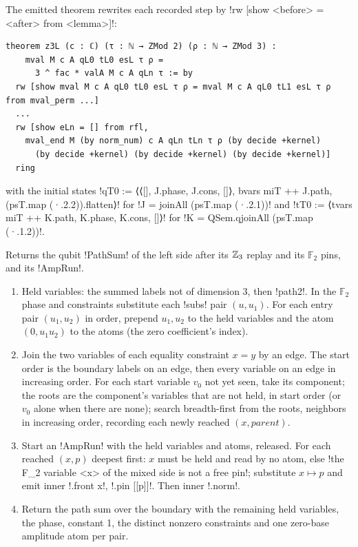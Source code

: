 {{{\begin{algorithm}
\end{algorithm}
The emitted theorem rewrites each recorded step by \lexlean!rw [show <before> = <after> from <lemma>]!:
\begin{lstlisting}[style=lexlean]
theorem z3L (c : ℂ) (τ : ℕ → ZMod 2) (ρ : ℕ → ZMod 3) :
    mval M c A qL0 tL0 esL τ ρ =
      3 ^ fac * valA M c A qLn τ := by
  rw [show mval M c A qL0 tL0 esL τ ρ = mval M c A qL0 tL1 esL τ ρ from mval_perm ...]
  ...
  rw [show eLn = [] from rfl,
    mval_end M (by norm_num) c A qLn tLn τ ρ (by decide +kernel)
      (by decide +kernel) (by decide +kernel) (by decide +kernel)]
  ring
\end{lstlisting}
with the initial states
\lexlean!qT0 := ⟨⟨[], J.phase, J.cons, []⟩, bvars miT ++ J.path, (psT.map (·.2.2)).flatten⟩! for
\lexlean!J = joinAll (psT.map (·.2.1))! and
\lexlean!tT0 := ⟨tvars miT ++ K.path, K.phase, K.cons, []⟩! for
\lexlean!K = QSem.qjoinAll (psT.map (·.1.2))!.

\begin{algorithm}\label{alg:lean-export-mix-qubit}
Returns the qubit \lexpy!PathSum! of the left side after its $\mathbb{Z}_3$ replay and its
$\mathbb{F}_2$ pins, and its \lexpy!AmpRun!.
\begin{enumerate}
\item Held variables: the summed labels not of dimension 3, then \lexcode!path2!. In the
$\mathbb{F}_2$ phase and constraints substitute each \lexcode!subs! pair $(u, u_1)$. For each
entry pair $(u_1, u_2)$ in order, prepend $u_1, u_2$ to the held variables and the atom
$(0, u_1u_2)$ to the atoms (the zero coefficient's index).
\item Join the two variables of each equality constraint $x = y$ by an edge. The start order is
the boundary labels on an edge, then every variable on an edge in increasing order. For each
start variable $v_0$ not yet seen, take its component; the roots are the component's variables
that are not held, in start order (or $v_0$ alone when there are none); search breadth-first
from the roots, neighbors in increasing order, recording each newly reached
$(x, \mathit{parent})$.
\item Start an \lexpy!AmpRun! with the held variables and atoms, released. For each reached
$(x, p)$ deepest first: $x$ must be held and read by no atom, else
\lexcode!the F_2 variable <x> of the mixed side is not a free pin!; substitute $x \mapsto p$ and
emit inner \lexlean!.front x!, \lexlean!.pin [[p]]!. Then inner \lexlean!.norm!.
\item Return the path sum over the boundary with the remaining held variables, the phase,
constant 1, the distinct nonzero constraints and one zero-base amplitude atom per pair.
\end{enumerate}
\end{algorithm}

}}}
